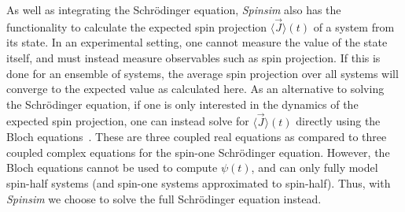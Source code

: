 \documentclass{jors}
\begin{document}
		As well as integrating the Schr\"odinger equation, \emph{Spinsim} also has the functionality to calculate the expected spin projection $ \langle \overrightarrow{J}\rangle (t) $ of a system from its state.
		In an experimental setting, one cannot measure the value of the state itself, and must instead measure observables such as spin projection.
		If this is done for an ensemble of systems, the average spin projection over all systems will converge to the expected value as calculated here.
		As an alternative to solving the Schr\"odinger equation, if one is only interested in the dynamics of the expected spin projection, one can instead solve for $ \langle \overrightarrow{J}\rangle (t) $ directly using the Bloch equations~\cite{bloch_nuclear_1946}.
		These are three coupled real equations as compared to three coupled complex equations for the spin-one Schr\"odinger equation.
		However, the Bloch equations cannot be used to compute $ \psi(t) $, and can only fully model spin-half systems (and spin-one systems approximated to spin-half).
		Thus, with \emph{Spinsim} we choose to solve the full Schr\"odinger equation instead.
		


	
\end{document}
